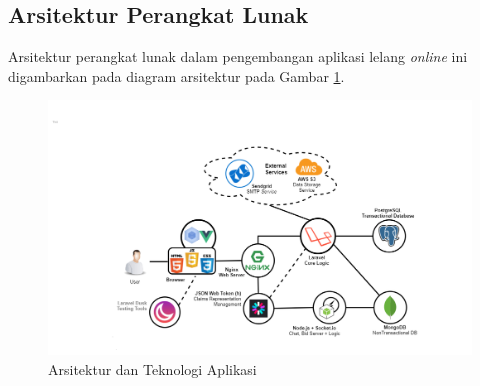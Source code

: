 
\subsection{Arsitektur Perangkat Lunak}
	\label{final-arch-tech}
	Arsitektur perangkat lunak dalam pengembangan aplikasi lelang \textit{online} ini digambarkan pada diagram arsitektur pada Gambar \ref{final-arch-tech-figure}.
	\begin{landscape}
		\begin{figure}[]
			\centering
			\includegraphics[height=\textheight]{images/bab3/arsitektur-app.png}
			\caption{Arsitektur dan Teknologi Aplikasi}
			\label{final-arch-tech-figure}
		\end{figure}
	\end{landscape}
	
	

